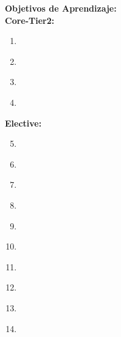 \noindent \textbf{Objetivos de Aprendizaje:}\\
\noindent \textbf{Core-Tier2:}
\begin{enumerate}
	\setcounter{enumi}{0}
	\item \IASCryptographyLODescribeTheCryptography\xspace[\IASCryptographyLODescribeTheCryptographyLevel]\label{sec:BOK:IASCryptographyLODescribeTheCryptography}
	\item \IASCryptographyLODefineTheCipher\xspace[\IASCryptographyLODefineTheCipherLevel]\label{sec:BOK:IASCryptographyLODefineTheCipher}
	\item \IASCryptographyLODiscussThePrime\xspace[\IASCryptographyLODiscussThePrimeLevel]\label{sec:BOK:IASCryptographyLODiscussThePrime}
	\item \IASCryptographyLOExplainHowInfrastructure\xspace[\IASCryptographyLOExplainHowInfrastructureLevel]\label{sec:BOK:IASCryptographyLOExplainHowInfrastructure}
\end{enumerate}
\noindent \textbf{Elective:}
\begin{enumerate}
	\setcounter{enumi}{4}
	\item \IASCryptographyLOUseCryptographic\xspace[\IASCryptographyLOUseCryptographicLevel]\label{sec:BOK:IASCryptographyLOUseCryptographic}
	\item \IASCryptographyLOIllustrateHow\xspace[\IASCryptographyLOIllustrateHowLevel]\label{sec:BOK:IASCryptographyLOIllustrateHow}
	\item \IASCryptographyLOUsePublic\xspace[\IASCryptographyLOUsePublicLevel]\label{sec:BOK:IASCryptographyLOUsePublic}
	\item \IASCryptographyLOExplainHowProtocols\xspace[\IASCryptographyLOExplainHowProtocolsLevel]\label{sec:BOK:IASCryptographyLOExplainHowProtocols}
	\item \IASCryptographyLODiscussCryptographic\xspace[\IASCryptographyLODiscussCryptographicLevel]\label{sec:BOK:IASCryptographyLODiscussCryptographic}
	\item \IASCryptographyLODescribeReal\xspace[\IASCryptographyLODescribeRealLevel]\label{sec:BOK:IASCryptographyLODescribeReal}
	\item \IASCryptographyLOSummarizePrecise\xspace[\IASCryptographyLOSummarizePreciseLevel]\label{sec:BOK:IASCryptographyLOSummarizePrecise}
	\item \IASCryptographyLOApplyAppropriate\xspace[\IASCryptographyLOApplyAppropriateLevel]\label{sec:BOK:IASCryptographyLOApplyAppropriate}
	\item \IASCryptographyLOAppreciate\xspace[\IASCryptographyLOAppreciateLevel]\label{sec:BOK:IASCryptographyLOAppreciate}
	\item \IASCryptographyLODescribeQuantum\xspace[\IASCryptographyLODescribeQuantumLevel]\label{sec:BOK:IASCryptographyLODescribeQuantum}
\end{enumerate}


